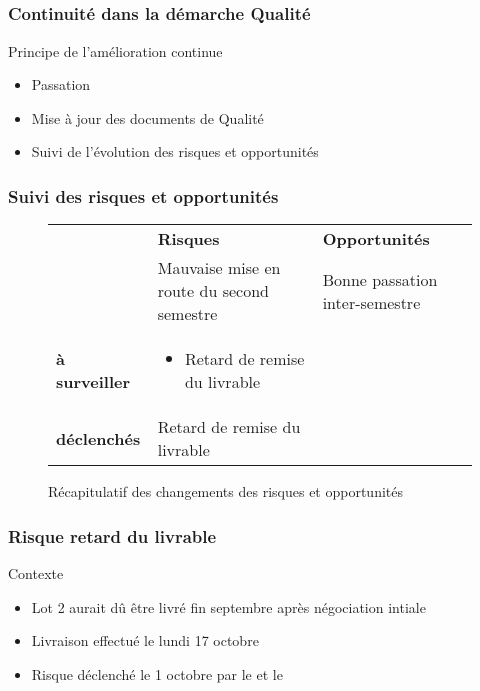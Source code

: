 
\speaker{\Kafui}

\subsection{} %


\begin{frame}
\frametitle{Continuité dans la démarche Qualité}
\begin{block}{Principe de l'amélioration continue}
\begin{itemize}
\item Passation 
\item Mise à jour des documents de Qualité
\item Suivi de l'évolution des risques et opportunités
\end{itemize}
\end{block}
\end{frame}




\begin{frame}
\frametitle{Suivi des risques et opportunités}
\begin{figure}
\begin{longtable}{|p{1.8cm}||p{3.5cm}|p{3.5cm}|}
\hline
 & \textbf{Risques} & \textbf{Opportunités} \\\hhline{|=||=|=|}
\multirow{1}{*}{\textbf{clôturés}} & \small Mauvaise mise en route du second semestre & \small Bonne passation inter-semestre \\\hline
\multirow{1}{*}{\textbf{à surveiller}} & \small \begin{itemize}	
						\item Retard de remise du livrable 
						\end{itemize}& \\\hline
\multirow{1}{*}{\textbf{déclenchés}} & \small Retard de remise du livrable & \\\hline
\end{longtable}
\caption{Récapitulatif des changements des risques et opportunités}
\end{figure}
\end{frame}



\begin{frame}
\frametitle{Risque retard du livrable}
\begin{block}{Contexte}
\begin{itemize}
\item Lot 2 aurait dû être livré fin septembre après négociation intiale
\item Livraison effectué le lundi 17 octobre
\item Risque déclenché le 1 octobre par le \RQ{} et le \CP{}
\end{itemize}
\end{block}
\end{frame}

